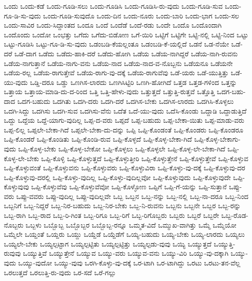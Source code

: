 {ಒಂದು
ಒಂದು-ಕಡೆ
ಒಂದು-ಗೂಡಿ-ಸಲು
ಒಂದು-ಗೂಡಿಸಿ
ಒಂದು-ಗೂಡಿಸಿ-ರು-ವುದು
ಒಂದು-ಗೂಡಿ-ಸುವ
ಒಂದು-ಗೂ-ಡಿ-ಸು-ವುದು
ಒಂದು-ಗೂಡಿ-ಸುವುದೊ
ಒಂದು-ದಿನ
ಒಂದು-ನೂರು
ಒಂದು-ಬಾರಿ
ಒಂದು-ಭಾಗ
ಒಂದು-ಸಲ
ಒಂದು-ಸಾವಿರ
ಒಂದು-ಸಿದ್ದಾಂತದ
ಒಂದೂ
ಒಂದೆ
ಒಂದೆಡೆ
ಒಂದೆ-ರಡು
ಒಂದೇ
ಒಂದೊ
ಒಂದೊಂದಾಗಿ
ಒಂದೊಂದು
ಒಂದೋ
ಒಂಭತ್ತು
ಒಗೆದು
ಒಗೆದು-ಬಿಡೋಣ
ಒಗೆ-ಯಿರಿ
ಒಟ್ಟಿಗೆ
ಒಟ್ಟಿಗೇ
ಒಟ್ಟಿ-ನಲ್ಲಿ
ಒಟ್ಟಿ-ನಿಂದ
ಒಟ್ಟು
ಒಟ್ಟು-ಗೂಡಿಸಿ
ಒಟ್ಟು-ಗೂ-ಡಿ-ಸು-ವುದು
ಒಡಂಬಡಿ-ಕೆಯಲ್ಲಂತೂ
ಒಡಂಬಡಿ-ಕೆ-ಯಲ್ಲಿದೆ
ಒಡನೆ
ಒಡ-ನೆಯೇ
ಒಡೆ-ದರೆ
ಒಡೆ-ದಾಗ
ಒಡೆದು
ಒಡೆದು-ಹಾಕಿ-ದರೆ
ಒಡೆದು-ಹೋಗಿ
ಒಡೆಯ
ಒಡೆಯ-ನಾಗಿದ್ದರೆ
ಒಡೆಯ-ನಾಗಿ-ರುವನು
ಒಡೆಯ-ನಾಗುತ್ತಾನೆ
ಒಡೆಯ-ನಾಗು-ವನು
ಒಡೆಯ-ನಾದ
ಒಡೆಯ-ನಾದ-ವ-ನೊಬ್ಬನು
ಒಡೆಯನೂ
ಒಡೆಯನೇ
ಒಡೆಯ-ರಲ್ಲ
ಒಡೆಯ-ರಾಗುತ್ತೇವೆ
ಒಡೆಯ-ರಾಗು-ವು-ದಕ್ಕೆ
ಒಡೆಯ-ರಾಗುವೆವು
ಒಡೆ-ಯರು
ಒಡೆ-ಯುತ್ತಿತ್ತು
ಒಡೆ-ಯು-ವುದು
ಒಡ್ಡಿ-ದರೂ
ಒಡ್ಡು
ಒಣಗಿಸ-ಲಾರದು
ಒಣಗಿಸಿಟ್ಟಿರಿ
ಒಣಗಿ-ಹೋಗಿದೆ
ಒತ್ತಡ
ಒತ್ತಡ-ಗಳಿಂದ
ಒತ್ತನ್ನು
ಒತ್ತಾಯ
ಒತ್ತಾಯ-ಮಾಡಿ-ದು-ದ-ರಿಂದ
ಒತ್ತಿ
ಒತ್ತಿ-ಹೇಳು-ವುದು
ಒತ್ತುತ್ತದೆ
ಒತ್ತುತ್ತಿ-ರುತ್ತವೆ
ಒತ್ತೊತ್ತಿ
ಒದಗ-ಬಹು-ದಾದ
ಒದಗ-ಬಹುದು
ಒದಗಿತು
ಒದಗಿ-ದರು
ಒದಗಿ-ದರೆ
ಒದಗಿಸ-ಬೇಕು
ಒದಗಿಸ-ಲಾರದು
ಒದಗಿಸಿ-ಕೊಳ್ಳಲು
ಒದಗಿ-ಸಿದ್ದು
ಒದಗಿಸು
ಒದಗಿ-ಸುವ
ಒದಗಿಸು-ವೆನು
ಒದೆತ
ಒದೆ-ಯು-ವುದು
ಒದೆಸಿ-ಕೊಂಡು
ಒದ್ದಾಡಿ
ಒದ್ದಾಡುತ್ತಿದೆ
ಒದ್ದು
ಒದ್ದೆಯ
ಒದ್ದೆ-ಯಾಗು-ವುದಿಲ್ಲ
ಒಪ್ಪ-ದ-ವರು
ಒಪ್ಪದೆ
ಒಪ್ಪ-ಬಹುದು
ಒಪ್ಪ-ಬೇಕಾ-ಯಿತು
ಒಪ್ಪ-ಮಾಡು-ವರು
ಒಪ್ಪ-ಲಿಲ್ಲ
ಒಪ್ಪಲೇ-ಬೇಕಾ-ಗಿದೆ
ಒಪ್ಪಲೇ-ಬೇಕಾ-ದು-ದನ್ನು
ಒಪ್ಪಿ
ಒಪ್ಪಿ-ಕೊಂಡಂತೆ
ಒಪ್ಪಿ-ಕೊಂಡರು
ಒಪ್ಪಿ-ಕೊಂಡರೂ
ಒಪ್ಪಿ-ಕೊಂಡರೆ
ಒಪ್ಪಿ-ಕೊಂಡಿತು
ಒಪ್ಪಿ-ಕೊಂಡಿ-ರುವ
ಒಪ್ಪಿ-ಕೊಳ್ಳದೆ
ಒಪ್ಪಿ-ಕೊಳ್ಳ-ಬೇಕಾ-ಗಿದೆ
ಒಪ್ಪಿ-ಕೊಳ್ಳ-ಬೇಕಾಗು-ವುದು
ಒಪ್ಪಿ-ಕೊಳ್ಳ-ಬೇಕು
ಒಪ್ಪಿ-ಕೊಳ್ಳ-ಬೇಕೋ
ಒಪ್ಪಿ-ಕೊಳ್ಳಲು
ಒಪ್ಪಿ-ಕೊಳ್ಳಲೇ
ಒಪ್ಪಿ-ಕೊಳ್ಳ-ಲೇ-ಬೇಕಾ-ಗಿದೆ
ಒಪ್ಪಿ-ಕೊಳ್ಳ-ಲೇ-ಬೇಕು
ಒಪ್ಪಿ-ಕೊಳ್ಳಿ
ಒಪ್ಪಿ-ಕೊಳ್ಳುತ್ತದೆ
ಒಪ್ಪಿ-ಕೊಳ್ಳುತ್ತೀರಿ
ಒಪ್ಪಿ-ಕೊಳ್ಳುತ್ತೇನೆ
ಒಪ್ಪಿ-ಕೊಳ್ಳುತ್ತೇವೆ
ಒಪ್ಪಿ-ಕೊಳ್ಳುವ
ಒಪ್ಪಿ-ಕೊಳ್ಳುವಂತೆ
ಒಪ್ಪಿ-ಕೊಳ್ಳುವನು
ಒಪ್ಪಿ-ಕೊಳ್ಳುವರು
ಒಪ್ಪಿ-ಕೊಳ್ಳುವಿರಾ
ಒಪ್ಪಿ-ಕೊಳ್ಳು-ವು-ದಕ್ಕೆ
ಒಪ್ಪಿ-ಕೊಳ್ಳುವು-ದರ
ಒಪ್ಪಿ-ಕೊಳ್ಳುವು-ದರಲ್ಲಿ
ಒಪ್ಪಿ-ಕೊಳ್ಳು-ವುದಿಲ್ಲ
ಒಪ್ಪಿ-ಕೊಳ್ಳು-ವುದಿಲ್ಲವೋ
ಒಪ್ಪಿ-ಕೊಳ್ಳುವುದು
ಒಪ್ಪಿ-ಕೊಳ್ಳುವುದೇ
ಒಪ್ಪಿ-ಕೊಳ್ಳುವುವು
ಒಪ್ಪಿ-ಕೊಳ್ಳುವೆವು
ಒಪ್ಪಿ-ಕೊಳ್ಳುವೆವೋ
ಒಪ್ಪಿ-ಕೊಳ್ಳೋಣ
ಒಪ್ಪಿಗೆ
ಒಪ್ಪಿ-ಗೆ-ಯನ್ನು
ಒಪ್ಪಿ-ಸುತ್ತಾನೆ
ಒಪ್ಪು-ವರು
ಒಪ್ಪು-ವವರು
ಒಪ್ಪು-ವುದಿಲ್ಲ
ಒಪ್ಪು-ವುದಿಲ್ಲವೇ
ಒಬ್ಬ
ಒಬ್ಬನ
ಒಬ್ಬ-ನನ್ನು
ಒಬ್ಬ-ನಲ್ಲಿ
ಒಬ್ಬ-ನಾ-ದರೂ
ಒಬ್ಬ-ನಿಂದ
ಒಬ್ಬನಿಗೆ
ಒಬ್ಬ-ನಿದ್ದರೆ
ಒಬ್ಬ-ನಿರ-ಬಹುದು
ಒಬ್ಬ-ನಿರ-ಬೇಕು
ಒಬ್ಬ-ನಿ-ರುವನು
ಒಬ್ಬನು
ಒಬ್ಬನೇ
ಒಬ್ಬರ
ಒಬ್ಬ-ರನ್ನು
ಒಬ್ಬ-ರಾಗಿ
ಒಬ್ಬ-ರಾದ
ಒಬ್ಬ-ರಿ-ಗಿಂತ
ಒಬ್ಬ-ರಿಗೂ
ಒಬ್ಬ-ರಿಗೆ
ಒಬ್ಬ-ರಿಗೊಬ್ಬರು
ಒಬ್ಬರು
ಒಬ್ಬರೆ
ಒಬ್ಬರೇ
ಒಬ್ಬ-ರೊಡ-ನೊಬ್ಬರು
ಒಬ್ಬಳು
ಒಬ್ಬೊಬ್ಬ
ಒಬ್ಬೊಬ್ಬರ
ಒಬ್ಬೊಬ್ಬ-ರನ್ನೂ
ಒಮ್ಮತ-ವಿದೆ
ಒಮ್ಮುಖ-ವಾಗಿತ್ತು
ಒಮ್ಮೆ
ಒಮ್ಮೆಯೋ
ಒಮ್ಮೆಲೇ
ಒಯ್ದಂತೆ
ಒಯ್ದರು
ಒಯ್ದು
ಒಯ್ದೆಡೆ
ಒಯ್ದೆಡೆಗೆ
ಒಯ್ಯ-ಬಹುದು
ಒಯ್ಯ-ಬೇಕು
ಒಯ್ಯ-ಲಾರದು
ಒಯ್ಯಲು
ಒಯ್ಯಲೇ-ಬೇಕು
ಒಯ್ಯಲ್ಪಟ್ಟಾಗ
ಒಯ್ಯಲ್ಪಟ್ಟಿತು
ಒಯ್ಯಲ್ಪಟ್ಟಿತ್ತು
ಒಯ್ಯಲ್ಪಡು-ವುವು
ಒಯ್ಯಿ
ಒಯ್ಯುತ್ತದೆ
ಒಯ್ಯುತ್ತಿ-ರುವುವು
ಒಯ್ಯುತ್ತಿವೆ
ಒಯ್ಯುತ್ತೇನೆ
ಒಯ್ಯುವ
ಒಯ್ಯು-ವರು
ಒಯ್ಯುವ-ವನು
ಒಯ್ಯು-ವಿರಿ
ಒಯ್ಯು-ವು-ದಕ್ಕಾಗಿ
ಒಯ್ಯು-ವುದು
ಒಯ್ಯು-ವುದೋ
ಒಯ್ಯು-ವುವು
ಒರಗಿ-ಕೊಳ್ಳು-ವು-ದಕ್ಕೆ
ಒರ-ಟಾಗಿ
ಒರ-ಟಾಗಿದ್ದು
ಒರಟು
ಒರಟು-ತನ-ವೆಲ್ಲ
ಒರಲುತ್ತದೆ
ಒರಲುತ್ತಿ-ರು-ವುದು
ಒರ-ಸದೆ
ಒರೆ-ಗಲ್ಲು
}
